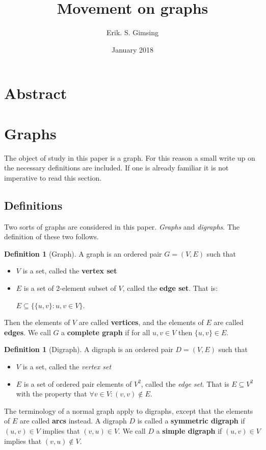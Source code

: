 \documentclass{article}
\title{Movement on graphs}
\author{Erik. S. Gimsing}
\date{January 2018}
\theoremstyle{plain}
\theoremstyle{definition}
\newtheorem{definition}[theorem]{Definition}
\begin{document}
\maketitle
\section{Abstract}
\section{Graphs}
The object of study in this paper is a graph. For this reason a small write up
on the necessary definitions are included. If one is already familiar it is not
imperative to read this section.
\subsection{Definitions}
Two sorts of graphs are considered in this paper. \textit{Graphs} and
\textit{digraphs}. The definition of these two follows.
\begin{definition}[Graph]\label{def graph}
	A graph is an ordered pair $G = (V,E)$ such that
	\begin{itemize}
		\item $V$ is a set, called the \textbf{vertex set}
		\item $E$ is a set of 2-element subset of $V$, called the \textbf{edge 
			set}. That is: 
			
			$E \subseteq \{\{u,v\}:u,v \in V\}$.
	\end{itemize}
	Then the elements of $V$ are called \textbf{vertices}, and the
	elements of $E$ are called \textbf{edges}. We call $G$ a \textbf{complete 
	graph} if for all $u,v\in V$ then $\{u,v\} \in E$.
\end{definition}
\begin{definition}[Digraph]\label{def digraph}
	A digraph is an ordered pair $D = (V,E)$ such that
	\begin{itemize}
		\item $V$ is a set, called the \textit{vertex set}
		\item $E$ is a set of ordered pair elements of $V^2$, called the 
			\textit{edge set}. That is $E \subseteq V^2$ with the property that
			$\forall v \in V: (v,v) \notin E$.
	\end{itemize}
	The terminology of a normal graph apply to digraphs, except that the
	elements of $E$ are called \textbf{arcs} instead. A digraph $D$ is called a
	\textbf{symmetric digraph} if $(u,v) \in V$ implies that $(v,u) \in V$. We
	call $D$ a \textbf{simple digraph} if $(u,v)\in V$ implies that $(v,u)
	\notin V$.
\end{definition}
\end{document}
